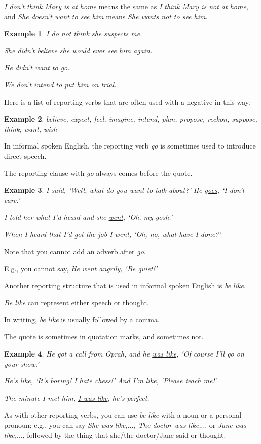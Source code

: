 \documentclass[oneside]{book}
\numberwithin{equation}{section}
\newtheorem{example}{Example}[section]
\begin{document}
\textit{I don't think Mary is at home} means the same as \textit{I think Mary is not at home}, and \textit{She doesn't want to see him} means \textit{She wants not to see him}.
\begin{example}
    I \underline{do not think} she suspects me.
    
    She \underline{didn't believe} she would ever see him again.
    
    He \underline{didn't want} to go.
    
    We \underline{don't intend} to put him on trial.
\end{example}
Here is a list of reporting verbs that are often used with a negative in this way:
\begin{example}
    believe, expect, feel, imagine, intend, plan, propose, reckon, suppose, think, want, wish
\end{example}
%
\noindent{} In informal spoken English, the reporting verb \textit{go} is sometimes used to introduce direct speech.

The reporting clause with \textit{go} always comes before the quote.
\begin{example}
    I said, `Well, what do you want to talk about?' He \underline{goes}, `I don't care.'
    
    I told her what I'd heard and she \underline{went}, `Oh, my gosh.'
    
    When I heard that I'd got the job \underline{I went}, `Oh, no, what have I done?'
\end{example}
Note that you cannot add an adverb after \textit{go}.

E.g., you cannot say, \textit{He went angrily, `Be quiet!'}

%
\noindent{} Another reporting structure that is used in informal spoken English is \textit{be like}.

\textit{Be like} can represent either speech or thought.

In writing, \textit{be like} is usually followed by a comma.

The quote is sometimes in quotation marks, and sometimes not.
\begin{example}
    He got a call from Oprah, and he \underline{was like}, `Of course I'll go on your show.'
    
    He\underline{'s like}, `It's boring! I hate chess!' And I\underline{'m like}, `Please teach me!'
    
    The minute I met him, \underline{I was like}, he's perfect.
\end{example}
As with other reporting verbs, you can use \textit{be like} with a noun or a personal pronoun: e.g., you can say \textit{She was like,$\ldots$, The doctor was like,$\ldots$} or \textit{Jane was like,$\ldots$}, followed by the thing that she/the doctor/Jane said or thought.
\end{document}
